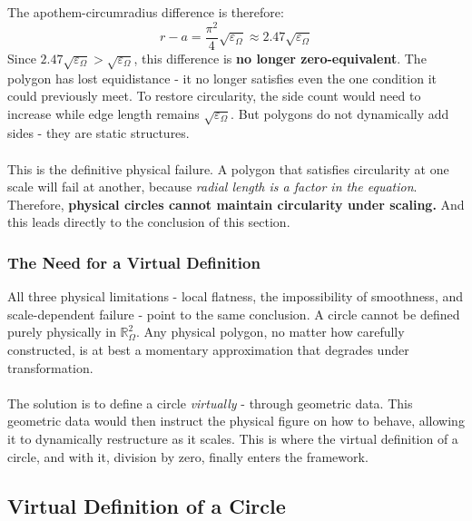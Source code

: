 \documentclass{article}
\begin{document}
The apothem-circumradius difference is therefore:
$$r - a = \frac{\pi^2}{4}\sqrt{\varepsilon_\Omega} \approx 2.47\sqrt{\varepsilon_\Omega}$$Since $2.47\sqrt{\varepsilon_\Omega} > \sqrt{\varepsilon_\Omega}$, this 
difference is \textbf{no longer zero-equivalent}. The polygon has lost 
equidistance - it no longer satisfies even the one condition it could 
previously meet. To restore circularity, the side count would need to increase 
while edge length remains $\sqrt{\varepsilon_\Omega}$. But polygons do not 
dynamically add sides - they are static structures.\\\\
This is the definitive physical failure. A polygon that satisfies circularity 
at one scale will fail at another, because \textit{radial length is a factor in the equation}. Therefore, \textbf{physical circles cannot maintain 
circularity under scaling.} And this leads directly to the conclusion of this 
section.

\subsubsection{The Need for a Virtual Definition}

All three physical limitations - local flatness, the impossibility of 
smoothness, and scale-dependent failure - point to the same conclusion. A 
circle cannot be defined purely physically in $\mathbb{R}_\Omega^2$. Any 
physical polygon, no matter how carefully constructed, is at best a momentary 
approximation that degrades under transformation.\\\\
The solution is to define a circle \textit{virtually} - through geometric data. This geometric data would then  instruct the physical figure on how to behave, allowing it to dynamically 
restructure as it scales. This is where the virtual definition of a circle, 
and with it, division by zero, finally enters the framework.

\subsection{Virtual Definition of a Circle}
\end{document}
